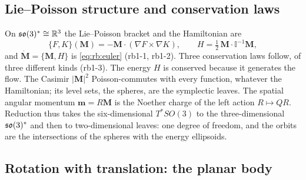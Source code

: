 \subsection{Lie--Poisson structure and conservation laws}
\label{sec:rb:lp}

On $\mathfrak{so}(3)^*\cong\mathbb{R}^3$ the Lie--Poisson bracket and the Hamiltonian are
\begin{equation}
\label{eq:rb:lp}
\{F,K\}(\mathbf M)=-\mathbf M\cdot(\nabla F\times\nabla K),\qquad H=\tfrac12\,\mathbf M\cdot\mathbb I^{-1}\mathbf M ,
\end{equation}
and $\dot{\mathbf M}=\{\mathbf M,H\}$ is \eqref{eq:rb:euler} (rb1-1, rb1-2). Three conservation laws follow, of three different kinds (rb1-3). The
energy $H$ is conserved because it generates the flow. The Casimir $|\mathbf M|^2$ Poisson-commutes with every function, whatever the Hamiltonian;
its level sets, the spheres, are the symplectic leaves. The spatial angular momentum $\mathbf m=R\mathbf M$ is the Noether charge of the left
action $R\mapsto QR$. Reduction thus takes the six-dimensional $T^*SO(3)$ to the three-dimensional $\mathfrak{so}(3)^*$ and then to two-dimensional
leaves: one degree of freedom, and the orbits are the intersections of the spheres with the energy ellipsoids.

\subsection{Rotation with translation: the planar body}
\label{sec:rb:se2}

